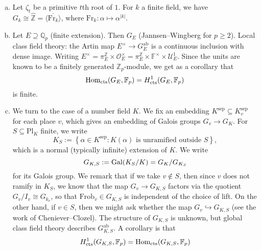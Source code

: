 \documentclass[reqno]{amsart} 
\numberwithin{theorem}{section}
\numberwithin{equation}{section}
\numberwithin{exercise}{section}
\begin{document}
\begin{example}
\begin{enumerate}[(a)]
  \item\label{enumerate:cq6r3g5d9c} Let $\zeta_t$ be a primitive $t$th root of $1$.  For $k$ a finite field, we have $G_k \cong \hat{\mathbb{Z}} = \overline{\langle \mathrm{Fr}_k \rangle}$, where $\mathrm{Fr}_k : \alpha \mapsto \alpha^{\lvert k \rvert}$.
  \item\label{enumerate:cq6r3g5e7y} Let $E \supseteq \mathbb{Q}_p$ (finite extension).  Then $G_E$ (Jannsen--Wingberg for $p \geq 2$).  Local class field theory: the Artin map $E^\times \rightarrow G_E^{\mathrm{ab}}$ is a continuous inclusion with dense image.  Writing $E^\times = \pi_E^{\mathbb{Z}} \times \mathcal{O}_E^\times = \pi_E^{\mathbb{Z}} \times \mathbb{F}^\times \times \mathcal{U}_E^1$.  Since the units are known to be a finitely generated $\mathbb{Z}_p$-module, we get as a corollary that
    \begin{equation*}
      \operatorname{Hom}_{\mathrm{cts}}(G_E, \mathbb{F}_p) = H^1_{\mathrm{cts}}(G_E, \mathbb{F}_p)
    \end{equation*}
    is finite.
  \item\label{enumerate:cq6r3g5cxb} We turn to the case of a number field $K$.  We fix an embedding $K^{\mathrm{sep}} \subseteq K_v^{\mathrm{sep}}$ for each place $v$, which gives an embedding of Galois groups $G_v \rightarrow G_K$.  For $S \subseteq \mathrm{P l}_K$ finite, we write
    \begin{equation*}
      K_S := \left\{ \alpha \in K^{\mathrm{sep}} : K(\alpha) \text{ is unramified outside } S \right\},
    \end{equation*}
    which is a normal (typically infinite) extension of $K$.  We write
    \begin{equation*}
      G_{K, S} := \operatorname{Gal}(K_S / K) = G_K / G_{K_S}
    \end{equation*}
    for its Galois group.  We remark that if we take $v \notin S$, then since $v$ does not ramify in $K_S$, we know that the map $G_v \rightarrow G_{K, S}$ factors via the quotient $G_v / I_v \cong G_{k_v}$, so that $\mathrm{Frob}_v \in G_{K, S}$ is independent of the choice of lift.  On the other hand, if $v \in S$, then we might ask whether the map $G_v \hookrightarrow G_{K, S}$ (see the work of Cheniever--Clozel).  The structure of $G_{K, S}$ is unknown, but global class field theory describes $G_{K, S}^{\mathrm{ab}}$.  A corollary is that
    \begin{equation*}
      H^{1}_{\mathrm{cts}}(G_{K, S}, \mathbb{F}_p) = \operatorname{Hom}_{\mathrm{cts}}(G_{K, S}, \mathbb{F}_p)
    \end{equation*}

\end{enumerate}
\end{example}
\end{document}
